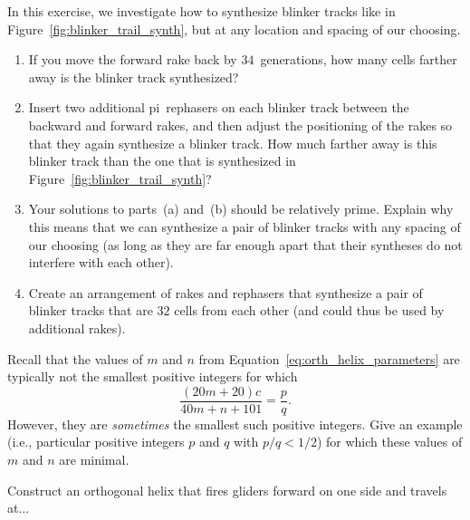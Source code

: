 \begin{multicols}{2}
\begin{problemstar}\label{exer:two_pi_tracks_synth_spacing} 
	In this exercise, we investigate how to synthesize blinker tracks like in Figure~\ref{fig:blinker_trail_synth}, but at any location and spacing of our choosing.\smallskip
	
	\begin{enumerate}[label=\bf\color{ocre}(\alph*)]
		\item If you move the forward rake back by $34$~generations, how many cells farther away is the blinker track synthesized?
		
		\item Insert two additional pi~rephasers on each blinker track between the backward and forward rakes, and then adjust the positioning of the rakes so that they again synthesize a blinker track. How much farther away is this blinker track than the one that is synthesized in Figure~\ref{fig:blinker_trail_synth}?
		
		\item Your solutions to parts~(a) and~(b) should be relatively prime. Explain why this means that we can synthesize a pair of blinker tracks with any spacing of our choosing (as long as they are far enough apart that their syntheses do not interfere with each other).
		
		\item Create an arrangement of rakes and rephasers that synthesize a pair of blinker tracks that are $32$ cells from each other (and could thus be used by additional rakes).
	\end{enumerate}
\end{problemstar}


\mfilbreak


\begin{problemstar}\label{exer:caterpillar_helix_when_minimal} 
	Recall that the values of $m$ and $n$ from Equation~\eqref{eq:orth_helix_parameters} are typically not the smallest positive integers for which
	\[
		\frac{(20m + 20)c}{40m + n + 101} = \frac{p}{q}.
	\]
	However, they are \emph{sometimes} the smallest such positive integers. Give an example (i.e., particular positive integers $p$ and $q$ with $p/q < 1/2$) for which these values of $m$ and $n$ are minimal.
\end{problemstar}


\mfilbreak


\begin{problem}\label{exer:construct_orthogonal_helix}
	Construct an orthogonal helix that fires gliders forward on one side and travels at...\smallskip
	

\end{problem}
\end{multicols}
